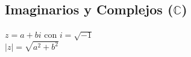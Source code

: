 \subsection{Imaginarios y Complejos ($\mathbb{C}$)}
$ z = a + bi $ con $ i = \sqrt{-1} $\\
$\mid z \mid = \sqrt{a^2 + b^2}$\\

